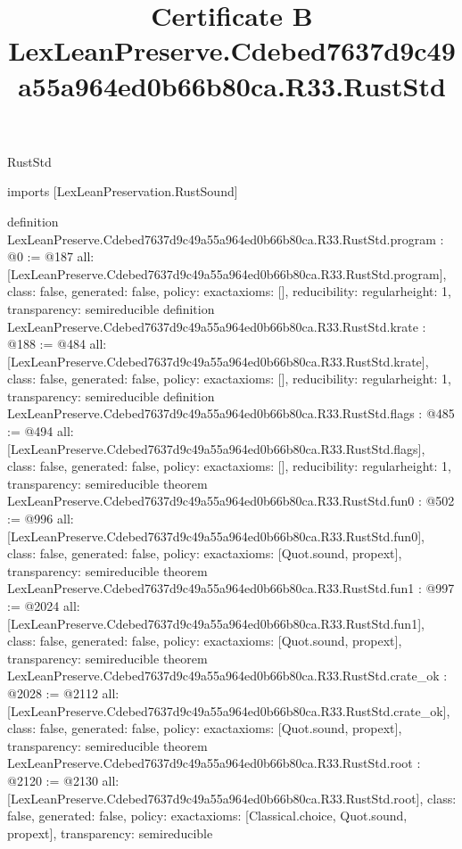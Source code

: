\begin{lexlean}{RustStd}
\title{Certificate B LexLeanPreserve.Cdebed7637d9c49a55a964ed0b66b80ca.R33.RustStd}
\begin{coremodule}
imports [LexLeanPreservation.RustSound]

definition LexLeanPreserve.Cdebed7637d9c49a55a964ed0b66b80ca.R33.RustStd.program : @0 := @187 {
  all: [LexLeanPreserve.Cdebed7637d9c49a55a964ed0b66b80ca.R33.RustStd.program],
  class: false,
  generated: false,
  policy: exact{axioms: []},
  reducibility: regular{height: 1},
  transparency: semireducible
}
definition LexLeanPreserve.Cdebed7637d9c49a55a964ed0b66b80ca.R33.RustStd.krate : @188 := @484 {
  all: [LexLeanPreserve.Cdebed7637d9c49a55a964ed0b66b80ca.R33.RustStd.krate],
  class: false,
  generated: false,
  policy: exact{axioms: []},
  reducibility: regular{height: 1},
  transparency: semireducible
}
definition LexLeanPreserve.Cdebed7637d9c49a55a964ed0b66b80ca.R33.RustStd.flags : @485 := @494 {
  all: [LexLeanPreserve.Cdebed7637d9c49a55a964ed0b66b80ca.R33.RustStd.flags],
  class: false,
  generated: false,
  policy: exact{axioms: []},
  reducibility: regular{height: 1},
  transparency: semireducible
}
theorem LexLeanPreserve.Cdebed7637d9c49a55a964ed0b66b80ca.R33.RustStd.fun0 : @502 := @996 {
  all: [LexLeanPreserve.Cdebed7637d9c49a55a964ed0b66b80ca.R33.RustStd.fun0],
  class: false,
  generated: false,
  policy: exact{axioms: [Quot.sound, propext]},
  transparency: semireducible
}
theorem LexLeanPreserve.Cdebed7637d9c49a55a964ed0b66b80ca.R33.RustStd.fun1 : @997 := @2024 {
  all: [LexLeanPreserve.Cdebed7637d9c49a55a964ed0b66b80ca.R33.RustStd.fun1],
  class: false,
  generated: false,
  policy: exact{axioms: [Quot.sound, propext]},
  transparency: semireducible
}
theorem LexLeanPreserve.Cdebed7637d9c49a55a964ed0b66b80ca.R33.RustStd.crate_ok : @2028 := @2112 {
  all: [LexLeanPreserve.Cdebed7637d9c49a55a964ed0b66b80ca.R33.RustStd.crate_ok],
  class: false,
  generated: false,
  policy: exact{axioms: [Quot.sound, propext]},
  transparency: semireducible
}
theorem LexLeanPreserve.Cdebed7637d9c49a55a964ed0b66b80ca.R33.RustStd.root : @2120 := @2130 {
  all: [LexLeanPreserve.Cdebed7637d9c49a55a964ed0b66b80ca.R33.RustStd.root],
  class: false,
  generated: false,
  policy: exact{axioms: [Classical.choice, Quot.sound, propext]},
  transparency: semireducible
}


\end{coremodule}
\end{lexlean}
